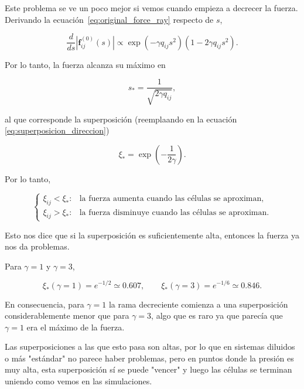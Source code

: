\documentclass[11pt,a4paper]{article}
\begin{document}
Este problema se ve un poco mejor si vemos cuando empieza a decrecer la fuerza. Derivando la ecuación~\eqref{eq:original_force_ray} respecto de $s$,

\begin{equation}
\frac{d}{ds}
\left|\mathbf f_{ij}^{(0)}(s)\right|
\propto
\exp\left(-\gamma q_{ij}s^2\right)
\left(
1-2\gamma q_{ij}s^2
\right).
\end{equation}

Por lo tanto, la fuerza alcanza su máximo en

\begin{equation}
s_*
=
\frac{1}{\sqrt{2\gamma q_{ij}}},
\label{eq:force_peak_distance}
\end{equation}

al que corresponde la superposición (reemplaando en la ecuación \ref{eq:superposicion_direccion})

\begin{equation}
\boxed{
\xi_*
=
\exp\left(-\frac{1}{2\gamma}\right)
}.
\label{eq:force_peak_overlap}
\end{equation}

Por lo tanto,

\begin{equation}
\begin{cases}
\xi_{ij}<\xi_*:
&
\text{la fuerza aumenta cuando las células se aproximan},
\\[4pt]
\xi_{ij}>\xi_*:
&
\text{la fuerza disminuye cuando las células se aproximan}.
\end{cases}
\end{equation}

Esto nos dice que si la superposición es suficientemente alta, entonces la fuerza ya nos da problemas.

Para $\gamma=1$ y $\gamma=3$,

\begin{equation}
\xi_*(\gamma=1)
=e^{-1/2}
\simeq0.607,
\qquad
\xi_*(\gamma=3)
=e^{-1/6}
\simeq0.846.
\end{equation}

En consecuencia, para $\gamma=1$ la rama decreciente comienza a una superposición considerablemente menor que para $\gamma=3$, algo que es raro ya que parecía que $\gamma=1$ era el máximo de la fuerza. 

Las superposiciones a las que esto pasa son altas, por lo que en sistemas diluidos o más "estándar" no parece haber problemas, pero en puntos donde la presión es muy alta, esta superposición sí se puede "vencer" y luego las células se terminan uniendo como vemos en las simulaciones.
\end{document}
